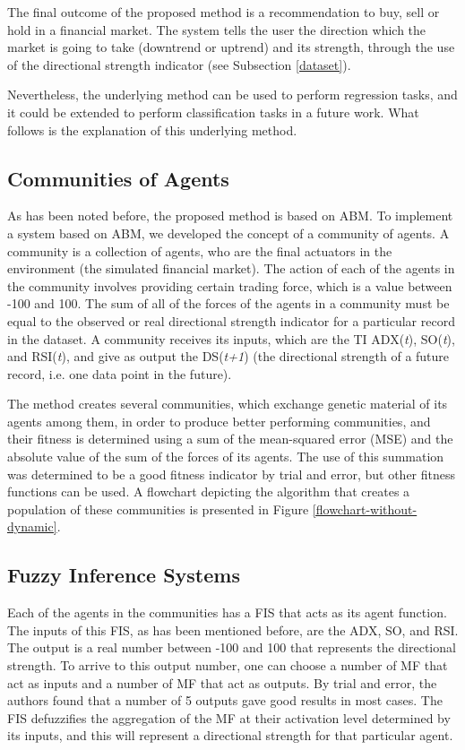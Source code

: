 The final outcome of the proposed method is a recommendation to buy, sell or hold in a financial market. The system tells the user the direction which the market is going to take (downtrend or uptrend) and its strength, through the use of the directional strength indicator (see Subsection \ref{dataset}).

Nevertheless, the underlying method can be used to perform regression tasks, and it could be extended to perform classification tasks in a future work. What follows is the explanation of this underlying method.

\subsection{Communities of Agents}
\label{communities-of-agents}

As has been noted before, the proposed method is based on ABM. To implement a system based on ABM, we developed the concept of a community of agents. A community is a collection of agents, who are the final actuators in the environment (the simulated financial market). The action of each of the agents in the community involves providing certain trading force, which is a value between -100 and 100. The sum of all of the forces of the agents in a community must be equal to the observed or real directional strength indicator for a particular record in the dataset. A community receives its inputs, which are the TI ADX(\textit{t}), SO(\textit{t}), and RSI(\textit{t}), and give as output the DS(\textit{t+1}) (the directional strength of a future record, i.e. one data point in the future).

The method creates several communities, which exchange genetic material of its agents among them, in order to produce better performing communities, and their fitness is determined using a sum of the mean-squared error (MSE) and the absolute value of the sum of the forces of its agents. The use of this summation was determined to be a good fitness indicator by trial and error, but other fitness functions can be used. A flowchart depicting the algorithm that creates a population of these communities is presented in Figure \ref{flowchart-without-dynamic}.

\subsection{Fuzzy Inference Systems}

Each of the agents in the communities has a FIS that acts as its agent function. The inputs of this FIS, as has been mentioned before, are the ADX, SO, and RSI. The output is a real number between -100 and 100 that represents the directional strength. To arrive to this output number, one can choose a number of MF that act as inputs and a number of MF that act as outputs. By trial and error, the authors found that a number of 5 outputs gave good results in most cases. The FIS defuzzifies the aggregation of the MF at their activation level determined by its inputs, and this will represent a directional strength for that particular agent.

